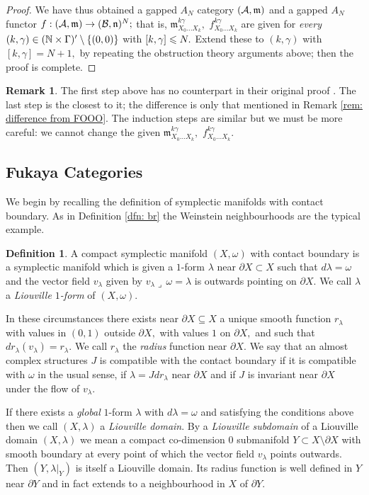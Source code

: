 \documentclass{article}
\theoremstyle{plain}%
\theoremstyle{definition}
\newtheorem{dfn}[thm]{Definition}
\newtheorem{rem}[thm]{Remark}
\numberwithin{equation}{section}
\numberwithin{figure}{section}
\def\l{\label}
\def\fm{{\mathfrak m}}
\def\fn{{\mathfrak n}}
\def\le{\leqslant\nobreak}
\def\cA{{\mathbin{\cal A}}}
\def\cB{{\mathbin{\cal B}}}
\def\ga{\gamma}
\def\la{\lambda}
\def\om{\omega}
\def\Ga{\Gamma}
\def\d{{\partial}}
\def\-{\setminus}
\def\sb{\subseteq}
\begin{document}
\begin{proof}
We have thus obtained a gapped $A_N$ category $(\cA,\fm)$ and a gapped $A_N$ functor $f:(\cA,\fm)\to(\cB,\fn)^N;$ that is, $\fm^{k\ga}_{X_0\dots X_k},$ $f^{k\ga}_{X_0\dots X_k}$ are given for {\it every} $(k,\ga)\in(\N\times\Ga)'\-\{(0,0)\}$ with $[k,\ga]\le N.$ Extend these to $(k,\ga)$ with $[k,\ga]=N+1,$ by repeating the obstruction theory arguments above; then the proof is complete.
\end{proof}
\begin{rem}
The first step above has no counterpart in their original proof \cite[Theorem 7.2.72]{FOOO}.
The last step is the closest to it; the difference is only that mentioned in Remark \ref{rem: difference from FOOO}.
The induction steps are similar but we must be more careful: we cannot change the given $\fm^{k\ga}_{X_0\dots X_k},$ $f^{k\ga}_{X_0\dots X_k}.$
\end{rem}



\subsection{Fukaya Categories}\l{sec: Fuk} 
We begin by recalling the definition of symplectic manifolds with contact boundary. As in Definition \ref{dfn: br} the Weinstein neighbourhoods are the typical example.
\begin{dfn}  \label{dfn:Liouv}
A compact symplectic manifold $(X,\om)$ with contact boundary is a symplectic manifold which is given a $1$-form $\la$ near $\d X\subset X$ such that $d\la=\om$ and the vector field $v_\la$ given by $v_\la\lrcorner \,\om=\la$ is outwards pointing on $\d X$. We call $\la$ a {\it Liouville $1$-form} of $(X,\om).$
 
In these circumstances there exists near $\d X\sb X$ a unique smooth function $r_\la$ with values in $(0,1)$ outside $\d X,$ with values $1$ on $\d X,$ and such that $dr_\la(v_\la) =r_\la.$ We call $r_\la$ the {\it radius} function near $\d X.$ We say that an almost complex structures $J$ is compatible with the contact boundary if it is compatible with $\om$ in the usual sense, if $\la=Jd r_\la$ near $\d X$ and if $J$ is invariant near $\d X$ under the flow of $v_\la.$

If there exists a {\it global} $1$-form $\la$ with $d\la=\om $ and satisfying the conditions above then we call $(X,\la)$ a {\it Liouville domain}. By a {\it Liouville subdomain} of a Liouville domain $(X,\la)$ we mean a compact co-dimension $0$ submanifold $Y\subset X\-\partial X$ with smooth boundary at every point of which the vector field $v_\la$ points outwards. Then $(Y,\la|_Y)$ is itself a Liouville domain. Its radius function is well defined in $Y$ near $\partial Y$ and in fact extends to a neighbourhood in $X$ of $\partial Y.$ 
\end{dfn}
\end{document}
